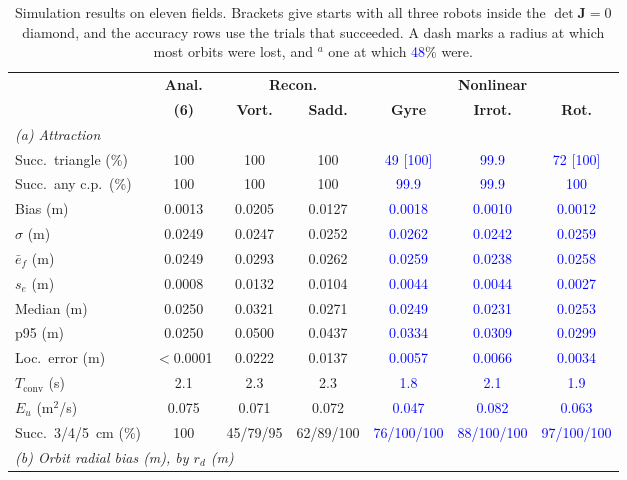 \documentclass[lettersize,journal]{IEEEtran}
\newcommand{\rev}[1]{#1}                             %
\newcommand{\newnum}[1]{\textcolor{blue}{#1}}        %
\begin{document}
\begin{table}[!t]
\scriptsize
\centering
\caption{Simulation results on eleven fields. Brackets give starts with all three robots inside the $\det\mathbf{J} = 0$ diamond, and the accuracy rows use the trials that succeeded. A dash marks a radius at which most orbits were lost, and $^{a}$ one at which \newnum{48}\% were.}
\label{tab:simulation_results}
\setlength{\tabcolsep}{1.3pt}
\rev{\begin{tabular}{l|c|cc|ccc}
\hline
 & \textbf{Anal.} & \multicolumn{2}{c|}{\textbf{Recon.}} & \multicolumn{3}{c}{\textbf{Nonlinear}} \\
 & \textbf{(6)} & \textbf{Vort.} & \textbf{Sadd.} & \textbf{Gyre} & \textbf{Irrot.} & \textbf{Rot.} \\
\hline
\multicolumn{7}{l}{\textit{(a) Attraction}} \\
\hline
Succ.\ triangle (\%) & 100 & 100 & 100 & \newnum{49 [100]} & \newnum{99.9} & \newnum{72 [100]} \\
Succ.\ any c.p.\ (\%) & 100 & 100 & 100 & \newnum{99.9} & \newnum{99.9} & \newnum{100} \\
Bias (m) & 0.0013 & 0.0205 & 0.0127 & \newnum{0.0018} & \newnum{0.0010} & \newnum{0.0012} \\
$\sigma$ (m) & 0.0249 & 0.0247 & 0.0252 & \newnum{0.0262} & \newnum{0.0242} & \newnum{0.0259} \\
$\bar{e}_f$ (m) & 0.0249 & 0.0293 & 0.0262 & \newnum{0.0259} & \newnum{0.0238} & \newnum{0.0258} \\
$s_e$ (m) & 0.0008 & 0.0132 & 0.0104 & \newnum{0.0044} & \newnum{0.0044} & \newnum{0.0027} \\
Median (m) & 0.0250 & 0.0321 & 0.0271 & \newnum{0.0249} & \newnum{0.0231} & \newnum{0.0253} \\
p95 (m) & 0.0250 & 0.0500 & 0.0437 & \newnum{0.0334} & \newnum{0.0309} & \newnum{0.0299} \\
Loc.\ error (m) & $<$0.0001 & 0.0222 & 0.0137 & \newnum{0.0057} & \newnum{0.0066} & \newnum{0.0034} \\
$T_{\mathrm{conv}}$ (s) & 2.1 & 2.3 & 2.3 & \newnum{1.8} & \newnum{2.1} & \newnum{1.9} \\
$E_u$ (m$^2$/s) & 0.075 & 0.071 & 0.072 & \newnum{0.047} & \newnum{0.082} & \newnum{0.063} \\
Succ.\ 3/4/5~cm (\%) & 100 & 45/79/95 & 62/89/100 & \newnum{76/100/100} & \newnum{88/100/100} & \newnum{97/100/100} \\
\hline
\multicolumn{7}{l}{\textit{(b) Orbit radial bias (m), by $r_d$ (m)}} \\

\end{tabular}}
\end{table}
\end{document}
